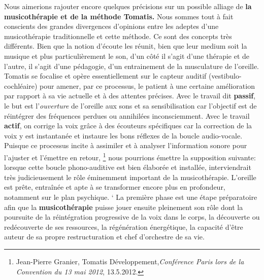  Nous aimerions rajouter encore quelques précisions sur un possible alliage de
\textbf{la musicothérapie et de la méthode Tomatis.} Nous sommes tout à fait conscients des
 grandes divergences d'opinions entre les adeptes d'une musicothérapie
 traditionnelle et cette méthode.
Ce sont des concepts très différents. Bien que la notion d'écoute les réunit, bien que leur medium soit la musique et plus particulièrement le son, d'un côté il s'agit d'une thérapie et de l'autre, il s'agit d'une pédagogie, d'un entrainement de la musculature de l'oreille. 
Tomatis se focalise et opère essentiellement sur le capteur auditif
(vestibulo-cochléaire) pour amener, par ce processus, le patient à une
certaine  amélioration par rapport à sa vie actuelle et à des attentes
précises. %
Avec le travail dit\textbf{ passif}, le  but est l'\emph{ouverture} de l'oreille
aux sons et sa sensibilisation car l'objectif est de réintégrer
des fréquences perdues ou annihilées inconsciemment. 
 Avec le travail\textbf{ actif}, on corrige la voix grâce à des écouteurs spécifiques 
car la correction de la voix y est instantanée et instaure les bons
réflexes de la boucle audio-vocale. Puisque ce processus incite à
assimiler et à analyser l'information sonore pour l'ajuster et
l'émettre en retour,%
\footnote{Jean-Pierre Granier, Tomatis 
Développement,\emph{Conférence Paris lors de la Convention du 13 mai 2012}, 13.5.2012.}
nous pourrions émettre la supposition suivante: lorsque cette boucle
phono-auditive est bien élaborée et installée, interviendrait très judicieusement le
rôle éminemment important de la musicothérapie. L'oreille est
prête, entraînée et apte à se transformer encore plus en profondeur, notamment sur le
plan psychique.%
`%
 La première phase est une étape préparatoire afin que la
 \textbf{musicothérapie} puisse jouer ensuite pleinement son rôle dont
la poursuite de la réintégration progressive de la voix dans
le corps, la découverte ou redécouverte de ses ressources,
la régénération énergétique, la capacité d'être auteur de sa propre
restructuration et chef d'orchestre de sa
vie.

